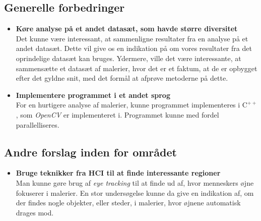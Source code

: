 {\subsection{Generelle forbedringer}
\begin{itemize}
    \item \textbf{Køre analyse på et andet datasæt, som havde større diversitet}\\
        Det kunne være interessant, at sammenligne resultater fra en
        analyse på et andet datasæt. Dette vil give os en indikation på
        om vores resultater fra det oprindelige datasæt kan bruges.
        Ydermere, ville det være interessante, at sammensætte et datasæt
        af malerier, hvor det er et faktum, at de er opbygget efter det
        gyldne snit, med det formål at afprøve metoderne på dette.
    \item \textbf{Implementere programmet i et andet sprog}\\
        For en hurtigere analyse af malerier, kunne programmet
        implementeres i $\textrm{C}^{++}$, som \emph{OpenCV} er
        implementeret i. Programmet kunne med fordel parallelliseres.
\end{itemize}

\subsection{Andre forslag inden for området}
\begin{itemize}
    \item \textbf{Bruge teknikker fra HCI til at finde interessante regioner}\\
        Man kunne gøre brug af \emph{eye tracking} til at finde ud af,
        hvor menneskers øjne fokuserer i malerier. En stor undersøgelse
        kunne da give en indikation af, om der findes nogle objekter,
        eller steder, i malerier, hvor øjnene automatisk drages mod.
\end{itemize}

}

